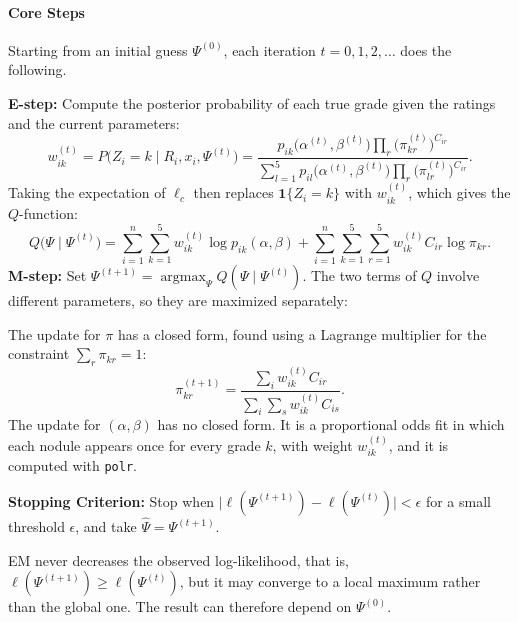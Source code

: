 \documentclass[12pt]{article}
\begin{document}
\paragraph{Core Steps}
Starting from an initial guess $\Psi^{(0)}$, each iteration
$t = 0, 1, 2, \dots$ does the following.
\begin{enumerate}
    \ii \textbf{E-step:} Compute the posterior probability of each true
    grade given the ratings and the current parameters:
    \[
      w_{ik}^{(t)} = P\bigl(Z_i = k \mid R_i, x_i, \Psi^{(t)}\bigr)
      = \frac{p_{ik}\bigl(\alpha^{(t)}, \beta^{(t)}\bigr)
      \prod_{r} \bigl(\pi_{kr}^{(t)}\bigr)^{C_{ir}}}
      {\sum_{l=1}^{5} p_{il}\bigl(\alpha^{(t)}, \beta^{(t)}\bigr)
      \prod_{r} \bigl(\pi_{lr}^{(t)}\bigr)^{C_{ir}}}.
    \]
    Taking the expectation of $\ell_c$ then replaces
    $\mathbf{1}\{Z_i = k\}$ with $w_{ik}^{(t)}$, which gives the
    $Q$-function:
    \[
      Q\bigl(\Psi \mid \Psi^{(t)}\bigr)
      = \sum_{i=1}^{n} \sum_{k=1}^{5} w_{ik}^{(t)}
      \log p_{ik}(\alpha, \beta)
      + \sum_{i=1}^{n} \sum_{k=1}^{5} \sum_{r=1}^{5} w_{ik}^{(t)}
      C_{ir} \log \pi_{kr}.
    \]
    \ii \textbf{M-step:} Set
    $\Psi^{(t+1)} = \operatorname{argmax}_{\Psi} Q(\Psi \mid \Psi^{(t)})$.
    The two terms of $Q$ involve different parameters, so they are
    maximized separately:
    \begin{itemize}
        \ii The update for $\pi$ has a closed form, found using a
        Lagrange multiplier for the constraint $\sum_r \pi_{kr} = 1$:
        \[
          \pi_{kr}^{(t+1)} = \frac{\sum_{i} w_{ik}^{(t)} C_{ir}}
          {\sum_{i} \sum_{s} w_{ik}^{(t)} C_{is}}.
        \]
        \ii The update for $(\alpha, \beta)$ has no closed form. It is a
        proportional odds fit in which each nodule appears once for
        every grade $k$, with weight $w_{ik}^{(t)}$, and it is computed
        with \texttt{polr}.
    \end{itemize}
    \ii \textbf{Stopping Criterion:} Stop when
    $\bigl|\ell(\Psi^{(t+1)}) - \ell(\Psi^{(t)})\bigr| < \epsilon$ for a
    small threshold $\epsilon$, and take $\hat{\Psi} = \Psi^{(t+1)}$.
\end{enumerate}

EM never decreases the observed log-likelihood, that is,
$\ell(\Psi^{(t+1)}) \ge \ell(\Psi^{(t)})$, but it may converge to a
local maximum rather than the global one. The result can therefore
depend on $\Psi^{(0)}$.
\end{document}
